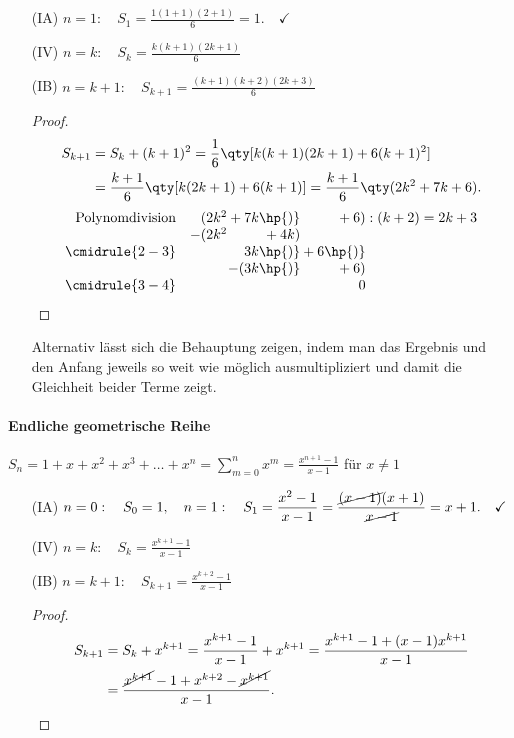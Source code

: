 \begin{enumerate}
    \item[(IA)] $\displaystyle n=1: \quad S_1 = \frac{1(1+1)(2+1)}{6} = 1 .\quad\checkmark$ 
    \item[(IV)] $\displaystyle n=k: \quad S_k = \frac{k(k+1)(2k+1)}{6}$
    \item[(IB)] $\displaystyle n=k+1:\quad S_{k+1} = \frac{(k+1)(k+2)(2k+3)}{6}$
    \begin{proof}$~$\\[-1.5cm]
        \begin{align}
            S_{k+1} &= S_k + (k+1)^2 = \frac{1}{6}\qty[k(k+1)(2k+1)+6(k+1)^2] \notag \\
            &= \frac{k+1}{6}\qty[k(2k+1)+6(k+1)] = \frac{k+1}{6}\qty(2k^2+7k+6).
        \end{align}
        \begin{align}
            \begin{array}{r r@{} r@{}  r@{} r}
                \text{Polynomdivision}&(2k^2 &{}+7k\hp{)}&{}+6) &\;:(k+2) = 2k+3 \\
              &-(2k^2 &{}+4k) \\ 
              \cmidrule{2-3}
                    & & 3k \hp{)} &{}+6\hp{)}\\
                    & &-(3k\hp{)}&{}+6) \\
              \cmidrule{3-4}
                    & & & 0
            \end{array}
        \end{align}
    \end{proof}
    Alternativ lässt sich die Behauptung zeigen, indem man das Ergebnis und den Anfang jeweils so weit wie möglich ausmultipliziert und damit die Gleichheit beider Terme zeigt.
\end{enumerate}

\paragraph{Endliche geometrische Reihe} $S_n = 1+ x+x^2+ x^3+ \hdots + x^n =\sum_{m=0}^n x^m = \frac{x^{n+1}-1}{x-1}$ für $x\neq 1$ 

\begin{enumerate}
    \item[(IA)] $\displaystyle n=0: \quad S_0 = 1, \quad n=1: \quad S_1 = \frac{x^2 -1}{x-1} = \frac{\cancel{(x-1)}(x+1)}{\cancel{x-1}} = x+1 .\quad\checkmark$ 
    \item[(IV)] $\displaystyle n=k: \quad S_k = \frac{x^{k+1}-1}{x-1}$
    \item[(IB)] $\displaystyle n=k+1:\quad S_{k+1} = \frac{x^{k+2}-1}{x-1}$
    \begin{proof}$~$\\[-1.5cm]
        \begin{align}
            S_{k+1} &= S_k + x^{k+1} = \frac{x^{k+1}-1}{x-1} + x^{k+1} = \frac{x^{k+1}-1 + (x-1)x^{k+1}}{x-1} \notag \\
            &= \frac{\cancel{x^{k+1}}-1 + x^{k+2}-\cancel{x^{k+1}}}{x-1}.
        \end{align}
    \end{proof}
\end{enumerate}


